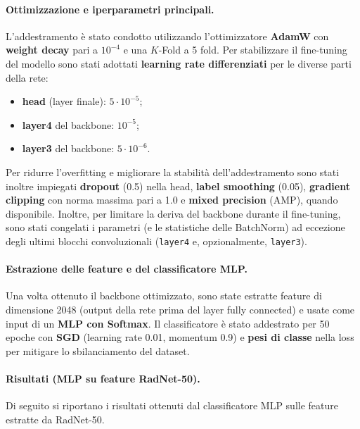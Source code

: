 \paragraph{Ottimizzazione e iperparametri principali.}
L’addestramento è stato condotto utilizzando l’ottimizzatore \textbf{AdamW} con \textbf{weight decay} pari a $10^{-4}$ e una $K$-Fold a 5 fold. Per stabilizzare il fine-tuning del modello sono stati adottati \textbf{learning rate differenziati} per le diverse parti della rete:
\begin{itemize}
    \item \textbf{head} (layer finale): $5\cdot10^{-5}$;
    \item \textbf{layer4} del backbone: $10^{-5}$;
    \item \textbf{layer3} del backbone: $5\cdot10^{-6}$.
\end{itemize}
Per ridurre l’overfitting e migliorare la stabilità dell’addestramento sono stati inoltre impiegati \textbf{dropout} (0.5) nella head, \textbf{label smoothing} (0.05), \textbf{gradient clipping} con norma massima pari a 1.0 e \textbf{mixed precision} (AMP), quando disponibile. Inoltre, per limitare la deriva del backbone durante il fine-tuning, sono stati congelati i parametri (e le statistiche delle BatchNorm) ad eccezione degli ultimi blocchi convoluzionali (\texttt{layer4} e, opzionalmente, \texttt{layer3}).

\paragraph{Estrazione delle feature e del classificatore MLP.}
Una volta ottenuto il backbone ottimizzato, sono state estratte feature di dimensione 2048 (output della rete prima del layer fully connected) e usate come input di un \textbf{MLP con Softmax}. Il classificatore è stato addestrato per 50 epoche con \textbf{SGD} (learning rate 0.01, momentum 0.9) e \textbf{pesi di classe} nella loss per mitigare lo sbilanciamento del dataset.

\paragraph{Risultati (MLP su feature RadNet-50).}
Di seguito si riportano i risultati ottenuti dal classificatore MLP sulle feature estratte da RadNet-50.

